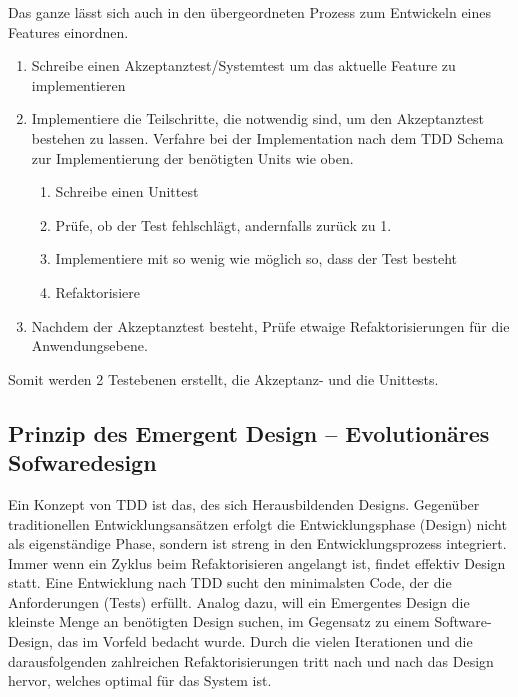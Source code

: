   Das ganze lässt sich auch in den übergeordneten Prozess zum Entwickeln eines Features einordnen.
  \begin{enumerate}
   \item Schreibe einen Akzeptanztest/Systemtest um das aktuelle Feature zu implementieren
   \item Implementiere die Teilschritte, die notwendig sind, um den Akzeptanztest bestehen zu lassen. Verfahre bei der Implementation nach dem TDD Schema zur Implementierung der benötigten Units wie oben.
    \begin{enumerate}
     \item Schreibe einen Unittest
     \item Prüfe, ob der Test fehlschlägt, andernfalls zurück zu 1.
     \item Implementiere mit so wenig wie möglich so, dass der Test besteht
     \item Refaktorisiere
    \end{enumerate}
   \item Nachdem der Akzeptanztest besteht, Prüfe etwaige Refaktorisierungen für die Anwendungsebene.   
  \end{enumerate}
  
  Somit werden 2 Testebenen erstellt, die Akzeptanz- und die Unittests.


\subsection{Prinzip des Emergent Design -- Evolutionäres Sofwaredesign}
Ein Konzept von TDD ist das, des sich Herausbildenden Designs. Gegenüber traditionellen Entwicklungsansätzen erfolgt die Entwicklungsphase (Design) nicht als eigenständige Phase, sondern ist streng in den Entwicklungsprozess integriert. Immer wenn ein Zyklus beim Refaktorisieren angelangt ist, findet effektiv Design statt. Eine Entwicklung nach TDD sucht den minimalsten Code, der die Anforderungen (Tests) erfüllt. Analog dazu, will ein Emergentes Design die kleinste Menge an benötigten Design suchen, im Gegensatz zu einem Software-Design, das im Vorfeld bedacht wurde. Durch die vielen Iterationen und die darausfolgenden zahlreichen Refaktorisierungen tritt nach und nach das Design hervor, welches optimal für das System ist. 




